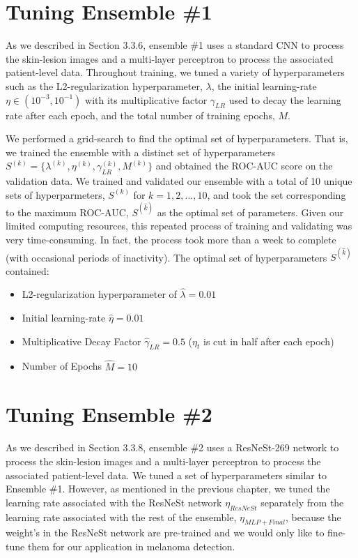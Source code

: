 \documentclass [MAS] {uclathes}
\begin{document}
\section{Tuning Ensemble \#1}

As we described in Section 3.3.6, ensemble \#1 uses a standard CNN to process the skin-lesion images and a multi-layer perceptron to process the associated patient-level data. Throughout training, we tuned a variety of hyperparameters such as the L2-regularization hyperparameter, $\lambda$, the initial learning-rate $\eta\in (10^{-3}, 10^{-1})$ with its multiplicative factor $\gamma_{LR}$ used to decay the learning rate after each epoch, and the total number of training epochs, $M$.

We performed a grid-search to find the optimal set of hyperparameters. That is, we trained the ensemble with a distinct set of hyperparameters $S^{(k)} = \{\lambda^{(k)}, \eta^{(k)}, \gamma_{LR}^{(k)}, M^{(k)}\}$ and obtained the ROC-AUC score on the validation data. We trained and validated our ensemble with a total of 10 unique sets of hyperparmeters, $S^{(k)}$ for $k=1, 2, ..., 10$, and took the set corresponding to the maximum ROC-AUC, $S^{(\hat k)}$ as the optimal set of parameters. Given our limited computing resources, this repeated process of training and validating was very time-consuming. In fact, the process took more than a week to complete (with occasional periods of inactivity). The optimal set of hyperparameters $S^{(\hat k)}$ contained:

\begin{itemize}
    \item L2-regularization hyperparameter of $\hat \lambda = 0.01$
    \item Initial learning-rate $\hat \eta = 0.01$
    \item Multiplicative Decay Factor $\hat \gamma_{LR} = 0.5$ ($\eta_{t}$ is cut in half after each epoch)
    \item Number of Epochs $\hat M=10$
\end{itemize}


\section{Tuning Ensemble \#2}

As we described in Section 3.3.8, ensemble \#2 uses a ResNeSt-269 network to process the skin-lesion images and a multi-layer perceptron to process the associated patient-level data. We tuned a set of hyperparameters similar to Ensemble \#1. However, as mentioned in the previous chapter, we tuned the learning rate associated with the ResNeSt network $\eta_{ResNeSt}$ separately from the learning rate associated with the rest of the ensemble, $\eta_{MLP + Final}$, because the weight's in the ResNeSt network are pre-trained and we would only like to fine-tune them for our application in melanoma detection.
\end{document}
